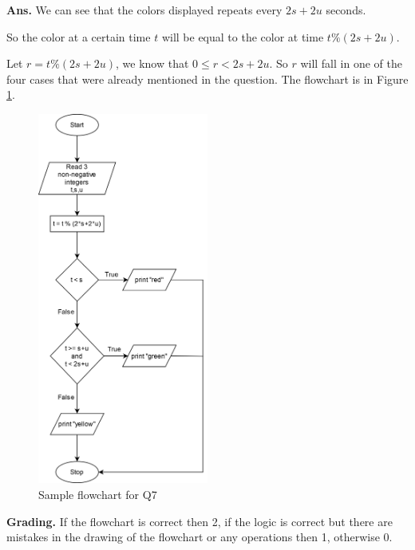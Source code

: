 \documentclass{article}
\begin{document}
\begin{flushleft}

\textbf{Ans. } We can see that the colors displayed repeats every $2s + 2u$ seconds. 

So the color at a certain time $t$ will be equal to the color at time $t \% (2s + 2u)$.

Let $r = t \% (2s + 2u)$, we know that $0 \leq r < 2s+2u$. So $r$ will fall in one of the four 
cases that were already mentioned in the question. The flowchart is in Figure \ref{Q7}.
    
\end{flushleft}

\begin{figure}[ht]
    \centering
    \includegraphics[width=0.5\textwidth]{Q7.png}
    \caption{Sample flowchart for Q7}
    \label{Q7}
\end{figure}

\begin{flushleft}

\textbf{Grading. } If the flowchart is correct then 2, if the logic is correct but there are 
mistakes in the drawing of the flowchart or any operations then 1, otherwise 0.

\end{flushleft}
    
\end{document}

